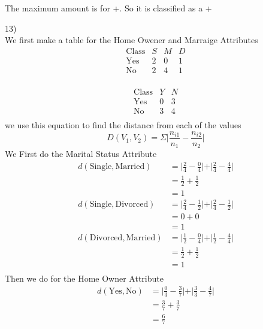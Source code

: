 \documentclass[12pt,english]{article}
\begin{document}
The maximum amount is for +. So it is classified as a +
\par
13)\\
We first make a table for the Home Owener and Marraige Attributes
\begin{equation}\tag{Marraige Status}
\begin{array}{c|ccc}
\mbox{Class}& S & M & D \\
\hline          
\mbox{Yes}   & 2 & 0 & 1 \\
\mbox{No}    & 2 & 4 & 1 \\
\end{array}
\end{equation}

\begin{equation}\tag{Home Owner}
\begin{array}{c|ccc}
\mbox{Class}& Y & N  \\
\hline          
\mbox{Yes}   & 0 & 3 \\
\mbox{No}    & 3 & 4 \\
\end{array}
\end{equation}
we use this equation to find the distance from each of the values
\begin{equation}
D(V_1,V_2) = \Sigma \vert \frac{n_{i1}}{n_1} - \frac{n_{i2}}{n_2}\vert
\end{equation}
We First do the Marital Status Attribute
\begin{equation*}
\begin{split}
d(\mbox{Single},\mbox{Married}) &= \vert\frac{2}{4} - \frac{0}{4}\vert + \vert\frac{2}{4} - \frac{4}{4}\vert\\
&= \frac{1}{2} + \frac{1}{2}\\
&= 1\\
d(\mbox{Single},\mbox{Divorced}) &= \vert\frac{2}{4} - \frac{1}{2}\vert + \vert\frac{2}{4} - \frac{1}{2}\vert\\
&= 0 + 0\\
&= 1\\
d(\mbox{Divorced},\mbox{Married}) &= \vert\frac{1}{2} - \frac{0}{4}\vert + \vert\frac{1}{2} - \frac{4}{4}\vert\\
&= \frac{1}{2} + \frac{1}{2}\\
&= 1\\
\end{split}
\end{equation*}
Then we do for the Home Owner Attribute
\begin{equation*}
\begin{split}
d(\mbox{Yes},\mbox{No}) &= \vert\frac{0}{3} - \frac{3}{7}\vert + \vert\frac{3}{3} - \frac{4}{7}\vert\\
&= \frac{3}{7} + \frac{3}{7}\\
&= \frac{6}{7}\\
\end{split}
\end{equation*}
\end{document}
